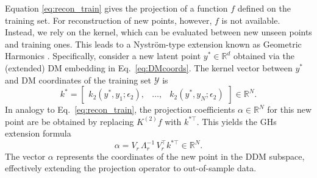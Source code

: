 \documentclass{article}
\begin{document}
Equation \eqref{eq:recon_train} gives the projection of a function $f$ defined on the training set. For reconstruction of new points, however, $f$ is not available. Instead, we rely on the kernel, which can be evaluated between new unseen points and training ones. This leads to a Nystr\"{o}m-type extension known as Geometric Harmonics \cite{coifman2006geometric}. Specifically, consider a new latent point $y^* \in \mathbb{R}^{d}$ obtained via the (extended) DM embedding in Eq.~\eqref{eq:DMcoords}. %
The kernel vector between $y^*$ and DM coordinates of the training set $\mathcal{Y}$ is  
\begin{equation}
    k^*=
\begin{bmatrix}
k_2(y^*, y_1; \epsilon_2), & \ldots, & k_2(y^*, y_N; \epsilon_2)
\end{bmatrix}\in \mathbb{R}^N.
\label{eq:2DMkernel}
\end{equation}
In analogy to Eq.~\eqref{eq:recon_train}, the projection coefficients $\alpha \in \mathbb{R}^N$ for this new point are be obtained by replacing $K^{(2)} f$ with $k^{*\top}$. This yields the GHs extension formula
\begin{equation}
    \alpha= V_r \, \Lambda_r^{-1} \, V_r^\top k^{*\top} \in \mathbb{R}^N.
    \label{eq:2DM2}
\end{equation}
The vector $\alpha$ represents the coordinates of the new point in the DDM subspace, effectively extending the projection operator to out-of-sample data.
\end{document}
